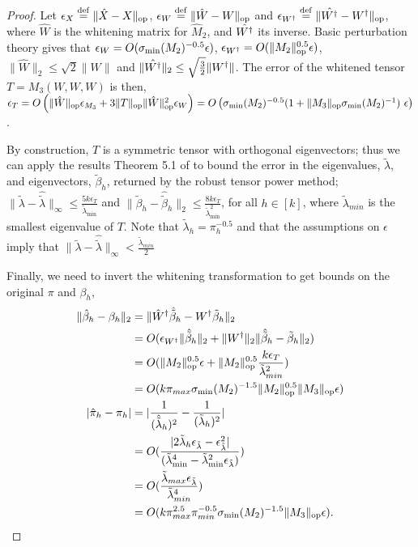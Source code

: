 \begin{proof}
Let 
$\epsilon_{X} \stackrel{\rm def}{=} \|\hat X - X\|_{\text{op}}$,
$\epsilon_W \stackrel{\rm def}{=} \|\hat W - W\|_{\text{op}}$ and
$\epsilon_{W^{\dagger}} \stackrel{\rm def}{=} \|\hat {W^{\dagger}} - W^{\dagger}\|_{\text{op}}$, where
$\hat W$ is the whitening
matrix for $\hat M_2$, and $\hat {W^{\dagger}}$ its inverse. 
Basic perturbation theory gives that $\epsilon_W
= O(\sigma_\text{\rm min}(M_2)^{-0.5} \epsilon)$, $\epsilon_{W^{\dagger}}
= O(\|M_2\|_{\text{op}}^{0.5} \epsilon)$, $\|\hat W\|_2 \le \sqrt{2} \|W\|$ and
$\|\hat {W^{\dagger}}\|_2 \le \sqrt\frac{3}{2} \|W^{\dagger}\|$.
The error of the whitened tensor $T = M_3(W,W,W)$ is then, $\epsilon_T
= O\left( \|\hat W\|_{\text{op}} \epsilon_{M_3} + 3 \|T\|_{\text{op}} \|\hat
W\|_{\text{op}}^2 \epsilon_{W} \right ) = O\left(\sigma_\text{\rm min}(M_2)^{-0.5} (1
+ \|M_3\|_{\text{op}} \sigma_\text{\rm min}(M_2)^{-1} )~\epsilon\right)$.

By construction, $T$ is a symmetric tensor with orthogonal eigenvectors;
thus we can apply the results Theorem 5.1 of \citet{AnandkumarGeHsu2012}
to bound the error in the eigenvalues, $\tilde \lambda$, and eigenvectors, $\tilde \beta_h$, returned by the
robust tensor power method; 
$\|\tilde \lambda - \hat {\tilde \lambda} \|_{\infty} \le \frac{5 k \epsilon_T}{\tilde \lambda_{\min}}$ 
and
$\|\tilde \beta_h - \hat {\tilde \beta}_h \|_2 \le \frac{8 k \epsilon_T}{\tilde \lambda_{\min}^2}$,
for all $h \in [k]$, where $\tilde \lambda_{min}$ is the smallest
eigenvalue of $T$. Note that $\tilde \lambda_h = \pi_h^{-0.5}$ and that
the assumptions on $\epsilon$ imply that $\|\tilde \lambda - \hat
{\tilde \lambda} \|_{\infty} < \frac{\tilde \lambda_{min}}{2}$

Finally, we need to invert the whitening transformation to get bounds on
the original $\pi$ and $\beta_h$,
\begin{align*}
  \|\hat \beta_h - \beta_h\|_2
  &= \| \hat W^{\dagger} \hat {\tilde \beta}_h - W^{\dagger} {\tilde \beta}_h \|_2 \\
  &= O( \epsilon_{W^{\dagger}} \|\hat{\tilde \beta}_h\|_2 + \|W^{\dagger}\|_2 \|\hat {\tilde \beta}_h - {\tilde \beta}_h\|_2 )\\
  &= O(\|M_2\|_{\text{op}}^{0.5} \epsilon + \|M_2\|_{\text{op}}^{0.5} \frac{k \epsilon_{T}}{\tilde \lambda_{min}^2}) \\
  &= O( k \pi_{max} \sigma_\text{\rm min}(M_2)^{-1.5} \|M_2\|_{\text{op}}^{0.5} \|M_3\|_{\text{op}} \epsilon ) \\
  |\hat \pi_h - \pi_h |
  &= |\frac{1}{(\hat{\tilde{\lambda}}_h)^2} - \frac{1}{({\tilde{\lambda}}_h)^2}| \\
  &= O( \frac{|2 {\tilde \lambda}_h \epsilon_{\tilde{\lambda}} - \epsilon_{\tilde{\lambda}}^2 |}{({\tilde \lambda}_{\min}^4 - {\tilde \lambda}_{\min}^2 \epsilon_{\tilde \lambda})} ) \\
  &= O( \frac{{\tilde \lambda}_{max} \epsilon_{\tilde \lambda}}{{\tilde\lambda}_{min}^4} ) \\
  &= O( k \pi_{max}^{2.5} \pi_{min}^{-0.5} \sigma_\text{\rm min}(M_2)^{-1.5} \|M_3\|_{\text{op}} \epsilon ).
\end{align*}

\end{proof}



